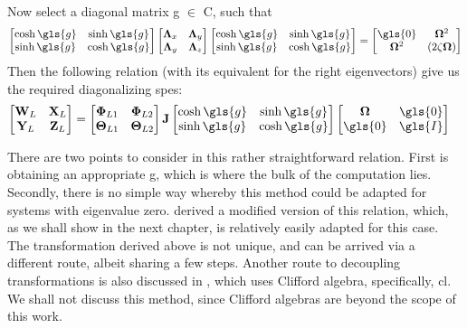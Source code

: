 Now select a diagonal matrix \gls{g} $\in$ \gls{C}, such that
\begin{align}
	\begin{bmatrix}
		\cosh{\gls{g}} & \sinh{\gls{g}}\\
		\sinh{\gls{g}} & \cosh{\gls{g}}\\
	\end{bmatrix}
	\begin{bmatrix}
		\mathbf{\Lambda}_x & \mathbf{\Lambda}_y\\
		\mathbf{\Lambda}_y & \mathbf{\Lambda}_z
	\end{bmatrix}
	\begin{bmatrix}
		\cosh{\gls{g}} & \sinh{\gls{g}}\\
		\sinh{\gls{g}} & \cosh{\gls{g}}\\
	\end{bmatrix} = 
	\begin{bmatrix}
		\gls{0} & \mathbf{\Omega}^2\\
		\mathbf{\Omega}^2 & (2\mathbf{\zeta\Omega})
	\end{bmatrix}
\end{align}
Then the following relation (with its equivalent for the right eigenvectors) 
give us the required diagonalizing \glspl{spe}:
\begin{align}
	\begin{bmatrix}
		\mathbf{W}_L & \mathbf{X}_L\\
		\mathbf{Y}_L & \mathbf{Z}_L
	\end{bmatrix} &= 
	\begin{bmatrix}
		\mathbf{\Phi}_{L1} & \mathbf{\Phi}_{L2}\\
		\mathbf{\Theta}_{L1} & \mathbf{\Theta}_{L2}
	\end{bmatrix}\mathbf{J}
	\begin{bmatrix}
		\cosh{\gls{g}} & \sinh{\gls{g}}\\
		\sinh{\gls{g}} & \cosh{\gls{g}}\\
	\end{bmatrix}
	\begin{bmatrix}
		\mathbf{\Omega} & \gls{0} \\
		\gls{0}  & \gls{I} 
	\end{bmatrix}
\end{align}

There are two points to consider in this rather straightforward relation.
First is obtaining an appropriate \gls{g}, which is where the bulk of the 
computation lies. Secondly, there is no simple way whereby this method 
could be adapted for systems with eigenvalue zero. \citet{Chu200896}
derived a modified version of this relation, which, as we shall show in the
next chapter, is relatively easily adapted for this case. The transformation 
derived above is not unique, and can be arrived via a different route, albeit 
sharing a few steps. Another route to decoupling transformations is also 
discussed in \citet{Friswell2001}, which uses Clifford algebra, specifically,
\gls{cl}. We shall not discuss this method, since Clifford algebras are 
beyond the scope of this work.

